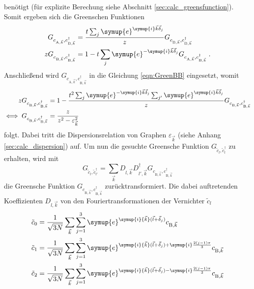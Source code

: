 benötigt (für explizite Berechung siehe Abschnitt \ref{sec:calc_greensfunction}).
Somit ergeben sich die Greenschen Funktionen
\begin{align}
    G_{c_{\text{A},\vec{k}}, c^\dagger_{\text{B},\vec{k}}} &=  \frac{t\sum_j \symup{e}^{\symup{i}\vec{k}\vec{\delta}_j}}{z} G_{c_{\text{B},\vec{k}}, c^\dagger_{\text{B},\vec{k}}}\\
    zG_{c_{\text{B},\vec{k}}, c^\dagger_{\text{B},\vec{k}}} &= 1 -  t\sum_j \symup{e}^{-\symup{i}\vec{k}\vec{\delta}_j} G_{c_{\text{A},\vec{k}}, c^\dagger_{\text{B},\vec{k}}} \; . \label{eqn:GreenBB}
\end{align}
Anschließend wird $G_{c_{\text{A},\vec{k}}, c^\dagger_{\text{B},\vec{k}}}$ in die Gleichung \eqref{eqn:GreenBB} eingesetzt, womit
\begin{align}
    zG_{c_{\text{B},\vec{k}}, c^\dagger_{\text{B},\vec{k}}} &= 1 - \frac{t^2\sum_j \symup{e}^{-\symup{i}\vec{k}\vec{\delta}_j} \sum_{j'} \symup{e}^{\symup{i}\vec{k}\vec{\delta}_{j}} }{z} G_{c_{\text{B},\vec{k}}, c^\dagger_{\text{B},\vec{k}}} \\
    \iff G_{c_{\text{B},\vec{k}}, c^\dagger_{\text{B},\vec{k}}} &= \frac{z}{z^2 - \varepsilon^2_{\vec{k}}  } \; 
\end{align}
folgt. 
Dabei tritt die Dispersionsrelation von Graphen $\varepsilon_{\vec{k}}$ (siehe Anhang \ref{sec:calc_dispersion}) auf. 
Um nun die gesuchte Greensche Funktion $G_{\tilde{c}_l, \tilde{c}_l^{\dagger}}$ zu erhalten, wird mit 
\begin{equation}
    G_{\tilde{c}_l, \tilde{c}^\dagger_{l'}} = \sum_{\vec{k}} D_{l,\vec{k}} D^\dagger_{l',\vec{k}}G_{c_{\text{B},\vec{k}}, c^\dagger_{\text{B},\vec{k}}} \label{eqn:koe}
\end{equation}
die Greensche Funktion $G_{c_{\text{B},\vec{k}}, c^\dagger_{\text{B},\vec{k}}}$ zurücktransformiert.
Die dabei auftretenden Koeffizienten $D_{l,\vec{k}}$ von den Fouriertransformationen der Vernichter $\tilde{c}_l$
\begin{align*}
    \tilde{c}_0 &= \frac{1}{\sqrt{3N}}\sum_{\vec{k}} \sum_{j=1}^3\symup{e}^{\symup{i}{\vec{k}}(\vec{l}+\vec{\delta}_j)}                              c_{\text{B}, \vec{k}}  \\
    \tilde{c}_1 &= \frac{1}{\sqrt{3N}}\sum_{\vec{k}} \sum_{j=1}^3\symup{e}^{\symup{i}{\vec{k}}(\vec{l}+\vec{\delta}_j)+\symup{i}\frac{2(j-1)\pi}{3}} c_{\text{B}, \vec{k}}  \\
    \tilde{c}_2 &= \frac{1}{\sqrt{3N}}\sum_{\vec{k}} \sum_{j=1}^3\symup{e}^{\symup{i}{\vec{k}}(\vec{l}+\vec{\delta}_j)-\symup{i}\frac{2(j-1)\pi}{3}} c_{\text{B}, \vec{k}}  
\end{align*}
